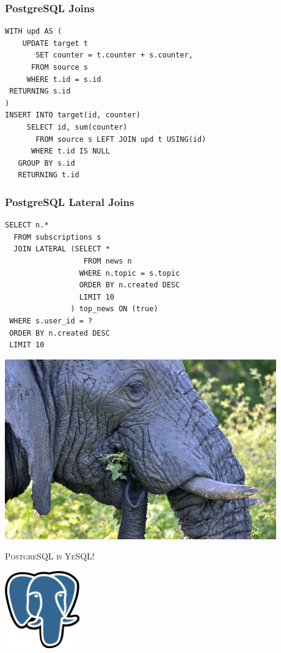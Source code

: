 \documentclass{beamer}
\begin{document}
\begin{frame}[fragile]
  \frametitle{PostgreSQL Joins}

  \begin{verbatim}
WITH upd AS (
    UPDATE target t
       SET counter = t.counter + s.counter,
      FROM source s
     WHERE t.id = s.id
 RETURNING s.id
)
INSERT INTO target(id, counter)
     SELECT id, sum(counter)
       FROM source s LEFT JOIN upd t USING(id)
      WHERE t.id IS NULL
   GROUP BY s.id
   RETURNING t.id
  \end{verbatim}
\end{frame}

\begin{frame}[fragile]
  \frametitle{PostgreSQL Lateral Joins}

  \vfill
  
  \begin{verbatim}
SELECT n.*
  FROM subscriptions s
  JOIN LATERAL (SELECT *
                  FROM news n
                 WHERE n.topic = s.topic
                 ORDER BY n.created DESC
                 LIMIT 10
               ) top_news ON (true)
 WHERE s.user_id = ?
 ORDER BY n.created DESC
 LIMIT 10
  \end{verbatim}
\end{frame}
 
\begin{frame}
  \begin{center}
    \includegraphics[height=21em]{postgresql-mongodb.jpg}
  \end{center}
\end{frame}

\begin{frame}
  \begin{center}
    \textsc{\Huge PostgreSQL is YeSQL!}
    \vfill

    \includegraphics[height=9em]{postgres-logo.eps}
  \end{center}
\end{frame}
\end{document}

